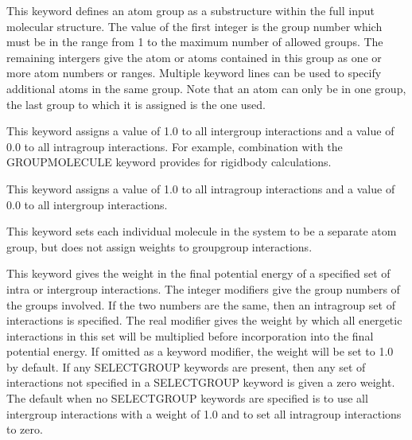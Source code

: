 \documentclass[letterpaper,11pt,english]{sphinxmanual}
\begin{document}




  This keyword defines an atom group as a substructure within the full input molecular structure. The value of the first integer is the group number which must be in the range from 1 to the maximum number of allowed groups. The remaining intergers give the atom or atoms contained in this group as one or more atom numbers or ranges. Multiple keyword lines can be used to specify additional atoms in the same group. Note that an atom can only be in one group, the last group to which it is assigned is the one used.

  This keyword assigns a value of 1.0 to all inter\sphinxhyphen{}group interactions and a value of 0.0 to all intra\sphinxhyphen{}group interactions. For example, combination with the GROUP\sphinxhyphen{}MOLECULE keyword provides for rigid\sphinxhyphen{}body calculations.

  This keyword assigns a value of 1.0 to all intra\sphinxhyphen{}group interactions and a value of 0.0 to all inter\sphinxhyphen{}group interactions.

  This keyword sets each individual molecule in the system to be a separate atom group, but does not assign weights to group\sphinxhyphen{}group interactions.

  This keyword gives the weight in the final potential energy of a specified set of intra\sphinxhyphen{} or intergroup interactions. The integer modifiers give the group numbers of the groups involved. If the two numbers are the same, then an intragroup set of interactions is specified. The real modifier gives the weight by which all energetic interactions in this set will be multiplied before incorporation into the final potential energy. If omitted as a keyword modifier, the weight will be set to 1.0 by default. If any SELECT\sphinxhyphen{}GROUP keywords are present, then any set of interactions not specified in a SELECT\sphinxhyphen{}GROUP keyword is given a zero weight. The default when no SELECT\sphinxhyphen{}GROUP keywords are specified is to use all intergroup interactions with a weight of 1.0 and to set all intragroup interactions to zero.
\end{document}
